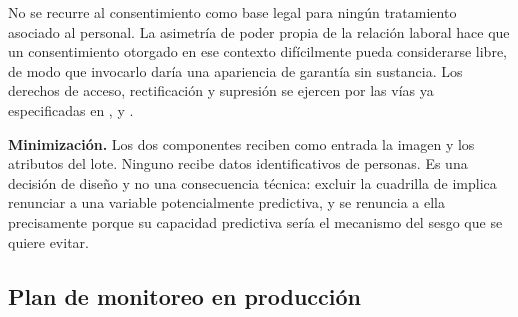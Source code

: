 \noindent
No se recurre al consentimiento como base legal para ningún tratamiento asociado al personal. La
asimetría de poder propia de la relación laboral hace que un consentimiento otorgado en ese contexto
difícilmente pueda considerarse libre, de modo que invocarlo daría una apariencia de garantía sin
sustancia. Los derechos de acceso, rectificación y supresión se ejercen por las vías ya especificadas
en ,  y .

\textbf{Minimización.} Los dos componentes reciben como entrada la imagen y los atributos del lote.
Ninguno recibe datos identificativos de personas. Es una decisión de diseño y no una consecuencia
técnica: excluir la cuadrilla de  implica renunciar a una variable potencialmente
predictiva, y se renuncia a ella precisamente porque su capacidad predictiva sería el mecanismo del
sesgo que se quiere evitar.

\subsection{Plan de monitoreo en producción}

